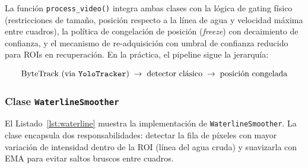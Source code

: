 La función \texttt{process\_video()} integra ambas clases con la lógica de
gating físico (restricciones de tamaño, posición respecto a la línea de agua
y velocidad máxima entre cuadros), la política de congelación de posición
(\textit{freeze}) con decaimiento de confianza, y el mecanismo de
re-adquisición con umbral de confianza reducido para ROIs en recuperación.
En la práctica, el pipeline sigue la jerarquía:

\begin{equation*}
    \text{ByteTrack (via \texttt{YoloTracker})}
    \;\rightarrow\;
    \text{detector clásico}
    \;\rightarrow\;
    \text{posición congelada}
\end{equation*}

%
%
%


%



\subsubsection{Clase \texttt{WaterlineSmoother}}

El Listado~\ref{lst:waterline} muestra la implementación de
\texttt{WaterlineSmoother}. La clase encapsula dos responsabilidades: detectar
la fila de píxeles con mayor variación de intensidad dentro de la ROI (línea
del agua cruda) y suavizarla con EMA para evitar saltos bruscos entre cuadros.


